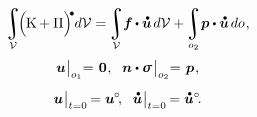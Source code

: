\nopagebreak
\hspace*{-\parindent}\begin{minipage}{\linewidth}
\begin{equation}\label{dynamicsoflineartheory:integralofenergy}
\displaystyle\integral\displaylimits_{\mathcal{V}}
\hspace{-0.4ex} \Bigl( \hspace{-0.1ex} \kinetic + \potential \Bigr)^{\hspace{-0.33ex}\tikz[baseline=-0.2ex] \draw[black, fill=black] (0,0) circle (.28ex);} d\mathcal{V}
= \hspace{-0.2ex}
\displaystyle\integral\displaylimits_{\mathcal{V}} \hspace{-0.5ex} \bm{f} \hspace{-0.1ex} \dotp \mathdotabove{\bm{u}} \hspace{.3ex} d\mathcal{V}
+ \hspace{-0.2ex}
\displaystyle\integral\displaylimits_{o_2} \hspace{-0.4ex} \bm{p} \dotp \mathdotabove{\bm{u}} \hspace{.3ex} do
\hspace{.15ex} ,
\end{equation}
%
\nopagebreak\vspace{-0.25em}\begin{gather*}
\bm{u} \hspace{.1ex} \bigr|_{o_1} \hspace{-0.64ex} = \hspace{.2ex} \bm{0}
\hspace{.1ex} ,
\hspace{.6em}
%
\unitnormalvector \dotp \linearstress \hspace{.2ex} \bigr|_{o_2} \hspace{-0.64ex} = \hspace{.2ex} \bm{p}
\hspace{.15ex} ,
%
\\[.5em]
%
\bm{u} \hspace{.1ex} \bigr|_{t=0} \hspace{-0.2ex} = \bm{u}^{\hspace{-0.1ex}\circ}
\hspace{-0.4ex} ,
\hspace{.6em}
%
\mathdotabove{\bm{u}} \hspace{.1ex} \bigr|_{t=0} \hspace{-0.2ex} = \mathdotabove{\bm{u}}^{\circ}
\hspace{-0.4ex} .
\end{gather*}
\end{minipage}

